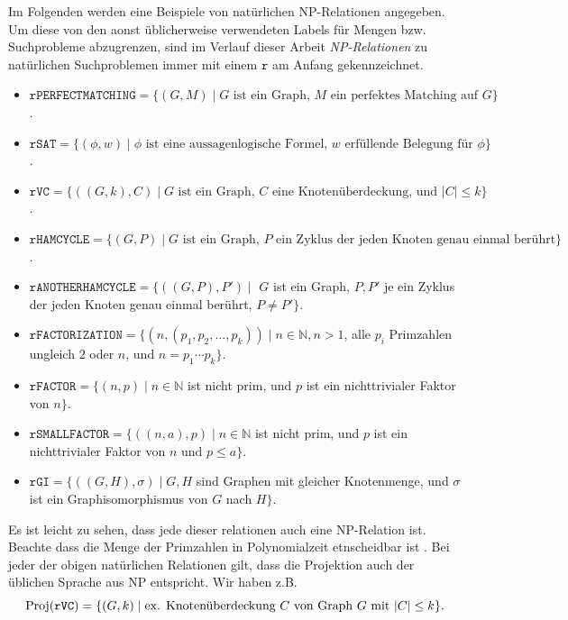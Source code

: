 Im Folgenden werden eine Beispiele von natürlichen NP-Relationen angegeben. Um diese von den aonst üblicherweise verwendeten Labels für Mengen bzw. Suchprobleme abzugrenzen, sind im Verlauf dieser Arbeit \emph{NP-Relationen} zu natürlichen Suchproblemen immer mit einem $\mathtt{r}$ am Anfang gekennzeichnet.
\begin{itemize}
\item $\mathtt{rPERFECTMATCHING} = \{ (G, M) \mid \text{$G$ ist ein Graph, $M$ ein perfektes Matching auf $G$} \}$.
\item $\mathtt{rSAT} = \{ (\phi, w) \mid \text{$\phi$ ist eine aussagenlogische Formel, $w$ erfüllende Belegung für $\phi$} \}$.
\item $\mathtt{rVC} = \{ ((G, k), C) \mid \text{$G$ ist ein Graph, $C$ eine Knotenüberdeckung, und $|C|\leq k$} \}$.
\item $\mathtt{rHAMCYCLE} = \{ (G, P) \mid \text{$G$ ist ein Graph, $P$ ein Zyklus der jeden Knoten genau einmal berührt} \}$.
\item $\mathtt{rANOTHERHAMCYCLE} = \{ ((G, P), P') \mid $ $G$ ist ein Graph, $P, P'$ je ein Zyklus der jeden Knoten genau einmal berührt, $P\neq P' \}$.
\item $\mathtt{rFACTORIZATION} = \{ (n, (p_1,p_2,\dots, p_k)) \mid n\in\mathbb N, n>1$, alle $p_i$ Primzahlen ungleich $2$ oder $n$, und $n=p_1\cdots p_k \}$.
\item $\mathtt{rFACTOR} = \{ (n, p) \mid n\in\mathbb N$ ist nicht prim, und $p$ ist ein nichttrivialer Faktor von $n\}$.
\item $\mathtt{rSMALLFACTOR} = \{ ((n, a), p) \mid n\in\mathbb N$ ist nicht prim, und $p$ ist ein nichttrivialer Faktor von $n$ und $p\leq a\}$.
\item $\mathtt{rGI} = \{ ((G, H), \sigma) \mid G, H$ sind Graphen mit gleicher Knotenmenge, und $\sigma$ ist ein Graphisomorphismus von $G$ nach $H\}$.
\end{itemize}
Es ist leicht zu sehen, dass jede dieser relationen auch eine NP-Relation ist. Beachte dass die Menge der Primzahlen in Polynomialzeit etnscheidbar ist \textcite{agrawal_primes_2004}.
Bei jeder der obigen natürlichen Relationen gilt, dass die Projektion auch der üblichen Sprache aus NP entspricht. Wir haben z.B.
\[ \operatorname{Proj}(\mathtt{rVC}) = \{ (G, k) \mid \text{ex. Knotenüberdeckung $C$ von Graph $G$ mit $|C|\leq k$} \}. \]

